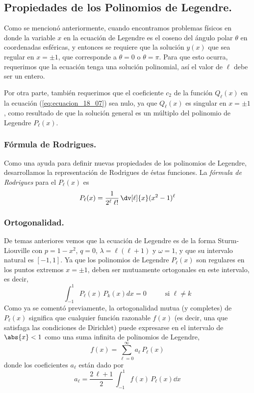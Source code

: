 \subsection{Propiedades de los Polinomios de Legendre.}
Como se mencionó anteriormente, cuando encontramos problemas físicos en donde la variable $x$ en la ecuación de Legendre es el coseno del ángulo polar $\theta$ en coordenadas esféricas, y entonces se requiere que la solución $y(x)$ que sea regular en $x = \pm 1$, que corresponde a $\theta = 0$ o $\theta = \pi$. Para que esto ocurra, requerimos que la ecuación tenga una solución polinomial, así el valor de $\ell$ debe ser un entero.
\par
Por otra parte, también requerimos que el coeficiente $c_{2}$ de la función $Q_{\ell}(x)$ en la ecuación (\ref{eq:ecuacion_18_07}) sea nulo, ya que $Q_{\ell}(x)$ es singular en $x = \pm 1$, como resultado de que la solución general es un múltiplo del polinomio de Legendre $P_{\ell}(x)$.
\subsubsection{Fórmula de Rodrigues.}
Como una ayuda para definir nuevas propiedades de los polinomios de Legendre, desarrollamos la representación de Rodrigues de éstas funciones. La \emph{fórmula de Rodrigues} para el $P_{\ell} (x)$ es
\begin{equation}
P_{\ell} (x) = \dfrac{1}{2^{\ell} \; \ell !} \, \dv[\ell]{x}  (x^{2} - 1)^{\ell}
\label{eq:ecuacion_18_09}
\end{equation}
\subsubsection{Ortogonalidad.}
De temas anteriores vemos que la ecuación de Legendre es de la forma Sturm-Liouville con $p = 1 - x^{2}$, $q = 0$, $\lambda = \ell (\ell + 1)$ y $\omega = 1$, y que su intervalo natural es $[-1, 1 ]$. Ya que los polinomios de Legendre $P_{\ell} (x)$ son regulares en los puntos extremos $x = \pm 1$, deben ser mutuamente ortogonales en este intervalo, es decir,
\begin{equation}
\int_{-1}^{1} P_{\ell}(x) \, P_{k}(x) dx = 0 \hspace{1cm} \text{ si } \ell \neq k
\label{eq:ecuacion_18_12}
\end{equation}
Como ya se comentó previamente, la ortogonalidad mutua (y completes) de  $P_{\ell} (x)$ significa que cualquier función razonable $f(x)$ (es decir, una que satisfaga las condiciones de Dirichlet) puede expresarse en el intervalo de $\abs{x} <1$ como una suma infinita de polinomios de Legendre,
\begin{equation}
f(x) = \sum_{\ell = 0}^{\infty} a_{\ell} \, P_{\ell} (x)
\label{eq:ecuacion_18_13}
\end{equation}
donde los coeficientes $a_{\ell}$ están dado por
\begin{equation}
a_{\ell} = \dfrac{2 \, \ell + 1}{2} \, \int_{-1}^{1} f(x) \, P_{\ell} (x) \dd{x}
\label{eq:ecuacion_18_14}
\end{equation}
